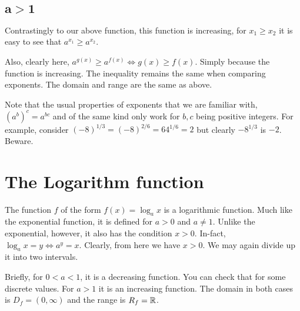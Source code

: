  \subsection[Case II]{\(\mathbf{a > 1}\)}

 Contrastingly to our above function, this function is increasing, for \(x_1 \ge x_2\) it is easy
 to see that \(a^{x_1} \ge a^{x_2}\). 

 \begin{figure}
    [H]
    \centering
 \end{figure}

 Also, clearly here, \(a^{g(x)} \ge a^{f(x)} \iff g(x) \ge f(x)\). Simply because the function is 
increasing. The inequality remains the same when comparing exponents. The domain and range
are the same as above. 

\begin{remark}
    Note that the usual properties of exponents that we are familiar with, \((a^{b})^{c} = a^{bc}\)
    and of the same kind only work for \(b, c\) being positive integers. For example, consider
    \((-8)^{1/3} = (-8)^{2/6} = 64^{1/6} = 2\) but clearly \(-8^{1/3}\) is \(-2\). Beware.
\end{remark}

\section{The Logarithm function}

The function \(f\) of the form \(f(x) = \log_{a} x\) is a logarithmic function. Much like 
the exponential function, it is defined for \(a > 0\) and \(a \ne 1\). Unlike the exponential, 
however, it also has the condition \(x > 0\). In-fact, \(\log_{a} x = y \iff a^y = x\). Clearly,
from here we have \(x > 0\). We may again divide up it into two intervals.

Briefly, for \(0 < a < 1\), it is a decreasing function. You can check that for 
some discrete values. For \(a > 1\) it is an increasing function. The domain in
both cases is \(D_f = (0, \infty)\) and the range is \(R_f = \mathbb R\). 

